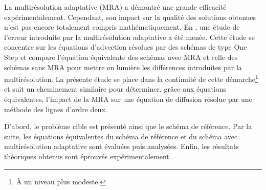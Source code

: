 La multirésolution adaptative (MRA) a démontré une grande efficacité expérimentalement.
Cependant, son impact sur la qualité des solutions obtenues n'est pas encore totalement compris mathématiquement.
En \cite{belloti_et_al_2025}, une étude de l'erreur introduite par la multirésolution adaptative a été menée.
Cette étude se concentre sur les équations d'advection résolues par des schémas de type One Step \cite{DARU2004563} et
compare l'équation équivalente des schémas avec MRA et celle des schémas sans MRA pour mettre en lumière les différences introduites par la multirésolution.
La présente étude se place dans la continuité de cette démarche\footnote{À un niveau plus modeste.} et suit un cheminement similaire
pour déterminer, grâce aux équations équivalentes, l'impact de la MRA sur une équation de diffusion résolue par une méthode des lignes d'ordre deux.

D'abord, le problème cible est présenté ainsi que le schéma de référence.
Par la suite, les équations équivalentes du schéma de référence et du schéma avec multirésolution adaptative sont évaluées puis analysées.
Enfin, les résultats théoriques obtenus sont éprouvés expérimentalement.